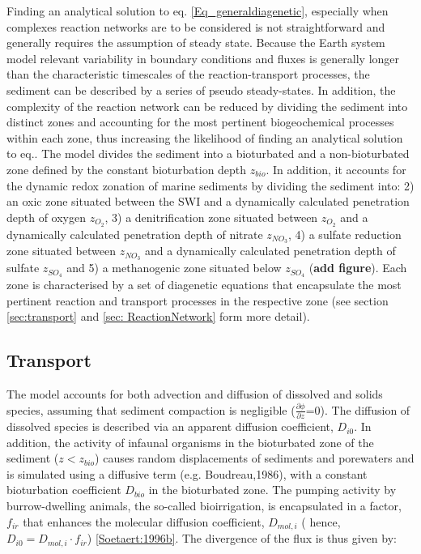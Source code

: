 \documentclass[gmd, manuscript]{copernicus}
\begin{document}
Finding an analytical solution to  eq. \ref{Eq_generaldiagenetic}, especially when complexes reaction networks are to be considered is not straightforward and generally requires the assumption of steady state. 
Because the Earth system model relevant variability in boundary conditions and fluxes is generally longer than the characteristic timescales of the reaction-transport processes, the sediment can be described by a 
series of pseudo steady-states. In addition, the complexity of the reaction network can be reduced by dividing the sediment into distinct zones and accounting for the most pertinent biogeochemical processes within each zone, 
thus increasing the likelihood of finding an analytical solution to eq.\label{Eq_generaldiagenetic}. The model divides the sediment into a bioturbated and a non-bioturbated zone defined by the constant bioturbation depth $z_{bio}$. 
In addition, it accounts for the dynamic redox zonation of marine sediments by dividing the sediment into: 2) an oxic zone situated between the SWI and a dynamically calculated penetration depth of oxygen $z_{O_2}$, 
3) a denitrification zone situated between $z_{O_2}$ and a dynamically calculated penetration depth of nitrate $z_{NO_3}$, 4) a sulfate reduction zone situated between $z_{NO_3}$ and a dynamically calculated penetration depth 
of sulfate $z_{SO_4}$ and 5) a methanogenic zone situated below $z_{SO_4}$ (\textbf{add figure}). 
Each zone is characterised by a set of diagenetic equations that encapsulate the most pertinent reaction and transport processes in the respective zone (see section \ref{sec:transport} and \ref{sec: ReactionNetwork} form more detail). 

\subsection{Transport}
The model accounts for both advection and diffusion of dissolved and solids species, assuming that sediment compaction is negligible ($\frac{\partial \phi}{\partial z}$=0). The diffusion of dissolved species is described via an 
apparent diffusion coefficient, $D_{i0}$. In addition, the activity of infaunal organisms in the bioturbated zone of the sediment ($z<z_{bio}$) causes random displacements of sediments and porewaters and is simulated using a 
diffusive term (e.g. Boudreau,1986), with a constant bioturbation coefficient $D_{bio}$ in the bioturbated zone. The pumping activity by burrow-dwelling animals, the so-called bioirrigation, is encapsulated in a factor, $f_{ir}$ 
that enhances the molecular diffusion coefficient, $D_{mol,i}$ ( hence, $D_{i0}=D_{mol,i}\cdot f_{ir}$) \ref{Soetaert:1996b}.  The divergence of the flux is thus given by:
\end{document}
